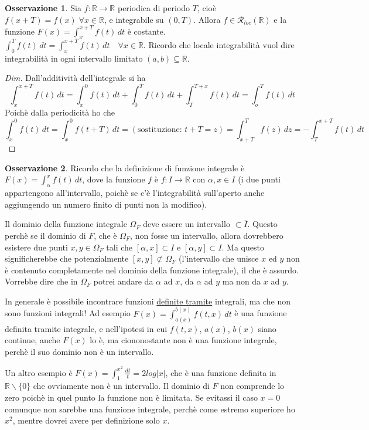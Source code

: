 \documentclass{article}
\theoremstyle{definition}
\theoremstyle{definition}
\theoremstyle{definition}
\theoremstyle{definition}
\newtheorem{remark}{Osservazione}[section]
\theoremstyle{definition}
\begin{document}
\begin{remark}
    Sia $f:\mathbb{R}\rightarrow\mathbb{R}$ periodica di periodo $T$, cioè $f(x+T)=f(x)\;\forall x\in\mathbb{R}$, e integrabile su $(0,T)$. Allora $f\in\mathcal{R}_{loc}(\mathbb{R})$ e la funzione $\displaystyle{F(x)=\int_x^{x+T}f(t)\,dt}$ è costante. $\displaystyle{\int_0^T f(t)\,dt=\int_x^{x+T}f(t)\,dt \quad \forall x\in\mathbb{R}}$. Ricordo che locale integrabilità vuol dire integrabilità in ogni intervallo limitato $(a,b)\subseteq\mathbb{R}$.
    \begin{proof}[Dim]
        Dall'additività dell'integrale si ha
        \[\int_x^{x+T}f(t)\,dt=\int_x^0 f(t)\,dt + \int_0^T f(t)\,dt + \int_T^{T+x}f(t)\,dt = \int_o^T f(t)\,dt\]
        Poichè dalla periodicità ho che 
        \[\int_x^0 f(t)\,dt=\int_x^0 f(t+T)\, dt = (\text{sostituzione: }t+T=z) = \int_{x+T}^T f(z)\,dz = -\int_T^{x+T} f(t)\,dt\]
    \end{proof}
\end{remark}

\begin{remark}
    Ricordo che la definizione di funzione integrale è $\displaystyle{F(x)=\int_\alpha^x f(t)\,dt}$, dove la funzione $f$ è $f:I\rightarrow\mathbb{R}$ con $\alpha,x\in I$ (i due punti appartengono all'intervallo, poichè se c'è l'integrabilità sull'aperto anche aggiungendo un numero finito di punti non la modifico).

    Il dominio della funzione integrale $\Omega_F$ deve essere un intervallo $\subset \overline{I}$. Questo perchè se il dominio di $F$, che è $\Omega_F$, non fosse un intervallo, allora dovrebbero esistere due punti $x,y\in\Omega_F$ tali che $[\alpha,x]\subset I$ e $[\alpha,y]\subset I$. Ma questo significherebbe che potenzialmente $[x,y]\not\subset\Omega_F$ (l'intervallo che unisce $x$ ed $y$ non è contenuto completamente nel dominio della funzione integrale), il che è assurdo. Vorrebbe dire che in $\Omega_F$ potrei andare da $\alpha$ ad $x$, da $\alpha$ ad $y$ ma non da $x$ ad $y$.

    \vspace{3mm}

    In generale è possibile incontrare funzioni \underline{definite tramite} integrali, ma che non sono funzioni integrali! Ad esempio $\displaystyle{F(x)=\int_{a(x)}^{b(x)}f(t,x)\,dt}$ è una funzione definita tramite integrale, e nell'ipotesi in cui $f(t,x)$, $a(x)$, $b(x)$ siano continue, anche $F(x)$ lo è, ma ciononostante non è una funzione integrale, perchè il suo dominio non è un intervallo.

    \vspace{3mm}

    Un altro esempio è $\displaystyle{F(x)=\int_1^{x^2}\frac{dt}{t}}=2log\left|x\right|$, che è una funzione definita in $\mathbb{R}\backslash\lbrace0\rbrace$ che ovviamente non è un intervallo. Il dominio di $F$ non comprende lo zero poichè in quel punto la funzione non è limitata. Se evitassi il caso $x=0$ comunque non sarebbe una funzione integrale, perchè come estremo superiore ho $x^2$, mentre dovrei avere per definizione solo $x$.
\end{remark}
\end{document}
